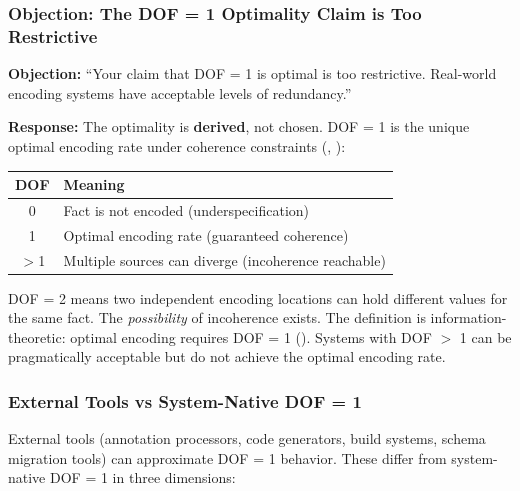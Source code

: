 
\subsubsection{Objection: The DOF = 1 Optimality Claim is Too Restrictive}

\textbf{Objection:} ``Your claim that DOF = 1 is optimal is too restrictive. Real-world encoding systems have acceptable levels of redundancy.''

\textbf{Response:} The optimality is \textbf{derived}, not chosen. DOF = 1 is the unique optimal encoding rate under coherence constraints (, ):

\begin{center}
\begin{tabular}{cl}
\toprule
\textbf{DOF} & \textbf{Meaning} \\
\midrule
0 & Fact is not encoded (underspecification) \\
1 & Optimal encoding rate (guaranteed coherence) \\
$>$1 & Multiple sources can diverge (incoherence reachable) \\
\bottomrule
\end{tabular}
\end{center}

DOF = 2 means two independent encoding locations can hold different values for the same fact. The \emph{possibility} of incoherence exists. The definition is information-theoretic: optimal encoding requires DOF = 1 (). Systems with DOF $>$ 1 can be pragmatically acceptable but do not achieve the optimal encoding rate.

\subsubsection{External Tools vs System-Native DOF = 1}

External tools (annotation processors, code generators, build systems, schema migration tools) can approximate DOF = 1 behavior. These differ from system-native DOF = 1 in three dimensions:


